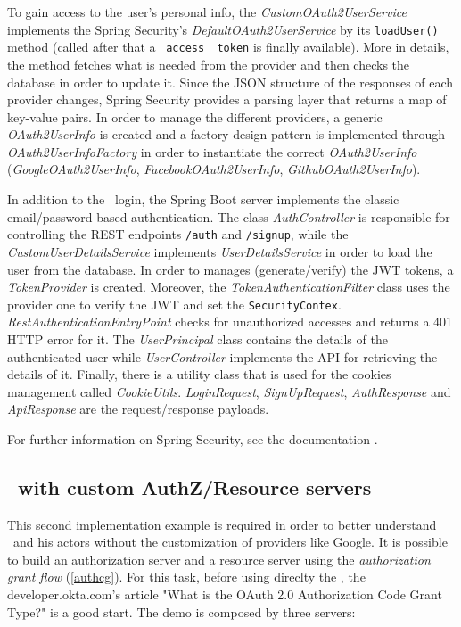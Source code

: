 To gain access to the user's personal info, the \textit{CustomOAuth2UserService} implements the Spring Security's \textit{DefaultOAuth2UserService} by its \texttt{loadUser()} method (called after that a \oauth\ \texttt{access\_ token} is finally available). More in details, the method fetches what is needed from the provider and then checks the database in order to update it. Since the JSON structure of the responses of each provider changes, Spring Security provides a parsing layer that returns a map of key-value pairs. In order to manage the different providers, a generic \textit{OAuth2UserInfo} is created and a factory design pattern is implemented through \textit{OAuth2UserInfoFactory} in order to instantiate the correct \textit{OAuth2UserInfo} (\textit{GoogleOAuth2UserInfo}, \textit{FacebookOAuth2UserInfo}, \textit{GithubOAuth2UserInfo}).

In addition to the \oauth\ login, the Spring Boot server implements the classic email/password based authentication. The class \textit{AuthController} is responsible for controlling the REST endpoints \texttt{/auth} and \texttt{/signup}, while the \textit{CustomUserDetailsService} implements \textit{UserDetailsService} in order to load the user from the database. In order to manages (generate/verify) the JWT tokens, a \textit{TokenProvider} is created. Moreover, the \textit{TokenAuthenticationFilter} class uses the provider one to verify the JWT and set the \texttt{SecurityContex}. \textit{RestAuthenticationEntryPoint} checks for unauthorized accesses and returns a 401 HTTP error for it. The \textit{UserPrincipal} class contains the details of the authenticated user while \textit{UserController} implements the API for retrieving the details of it. Finally, there is a utility class that is used for the cookies management called \textit{CookieUtils}. \textit{LoginRequest}, \textit{SignUpRequest}, \textit{AuthResponse} and \textit{ApiResponse} are the request/response payloads.

For further information on Spring Security, see the documentation \cite{sprsec}.

\subsection{\oauth\ with custom AuthZ/Resource servers}
This second implementation example is required in order to better understand \oauth\ and his actors without the customization of providers like Google. It is possible to build an authorization server and a resource server using the \textit{authorization grant flow} (\ref{authcg}). For this task, before using direclty the , the developer.okta.com's article "What is the OAuth 2.0 Authorization Code Grant Type?" \cite{oauth2} is a good start. The demo is composed by three servers:

